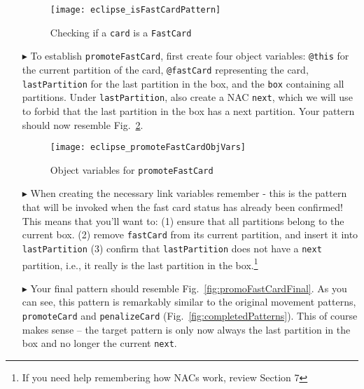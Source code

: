 \begin{itemize}
\begin{figure}[htp]
\begin{center}
  \texttt{[image: eclipse\_isFastCardPattern]}
  \caption{Checking if a \texttt{card} is a \texttt{FastCard}}
  \label{fig:isFastCardPattern}
\end{center}
\end{figure}

\newpage

\item[$\blacktriangleright$] To establish \texttt{promoteFastCard}, first create four object variables: \texttt{@this} for the
current partition of the card, \texttt{@fastCard} representing the card, \texttt{lastPartition} for the last partition in the box, and the \texttt{box}
containing all partitions. Under \texttt{lastPartition}, also create a NAC \texttt{next}, which we will use to forbid that the last partition in the box has a
next partition.
Your pattern should now resemble Fig.~\ref{fig:objVarFastCard}.

\vspace{0.5cm}

\begin{figure}[htp]
\begin{center}
  \texttt{[image: eclipse\_promoteFastCardObjVars]}
  \caption{Object variables for \texttt{promoteFastCard}}
  \label{fig:objVarFastCard}
\end{center}
\end{figure}

\item[$\blacktriangleright$] When creating the necessary link variables remember - this is the pattern that will be invoked when the fast card status has
already been confirmed! This means that you'll want to:
(1) ensure that all partitions belong to the current box.
(2) remove \texttt{fastCard} from its current partition, and insert it into \texttt{lastPartition}
(3) confirm that \texttt{lastPartition} does not have a \texttt{next} partition, i.e., it really is the last partition in the box.\footnote{If you need help
remembering how NACs work, review Section 7}

\item[$\blacktriangleright$] Your final pattern should resemble Fig.~\ref{fig:promoFastCardFinal}. As you can see, this pattern is remarkably similar to the
original movement patterns, \texttt{pro\-mote\-Card} and \texttt{pen\-a\-lize\-Card} (Fig.~\ref{fig:completedPatterns}). This of course makes sense -- the
target pattern is only now always the last partition in the box and no longer the current \texttt{next}.


\end{itemize}
